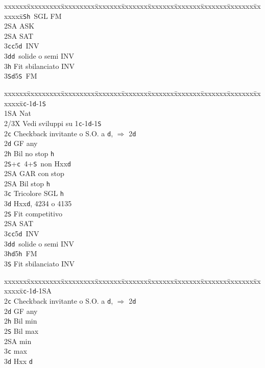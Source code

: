 \documentclass[a4paper,italian]{article}
\newcommand{\BS}{\small{\texttt{S}}}
\newcommand{\BC}{\small{\texttt{c}}}
\newcommand{\BD}{\small{\texttt{d}}}
\newcommand{\BH}{\small{\texttt{h}}}
\newenvironment{bidtable}
{\begin{tabbing}

    xxxxxx\=xxxxxxxxx\=xxxxxxxxx\=xxxxxxx\=xxxxxxx\=xxxxxxx\=xxxxxxx\=xxxxxxx\=xxxxxxx\=xxxxxxx\=\kill}
{\end{tabbing} }%
\begin{document}
\begin{multicols}{2}
\begin{bidtable}
        2\BS {}\BH\ SGL FM\+\\
        2\small{SA} \> ASK\-\\
        2\small{SA} \small{SA}T\\
        3\BC {}\BC 5\BD\ INV\\
        3\BD {}\BD\ solide o semi INV\\
        3\BH \> Fit sbilanciato INV\\
        3\BS {}\BD 5\BS\ FM\-
    \end{bidtable}
    \begin{bidtable}
        1\BC-1\BD-1\BS\+\\
        1\small{SA} \> Nat\+\\
        2/3X \> Vedi sviluppi su 1\BC -1\BD -1\BS \-\\
        2\BC \> Checkback invitante o S.O. a \BD , $\Rightarrow$ 2\BD \\
        2\BD \> GF any\+\\
        2\BH \> Bil no stop \BH \\
        2\BS {}+\BC\ 4+\BS\ non Hxx\BD \+\\
        2\small{SA} \> GAR con stop\-\\
        2\small{SA} \> Bil stop \BH \\
        3\BC \> Tricolore SGL \BH \\
        3\BD \> Hxx\BD, 4234 o 4135 \-\\
        [2pt]2\BS \> Fit competitivo\\
        2\small{SA} \small{SA}T\\
        3\BC {}\BC 5\BD\ INV\\
        3\BD {}\BD\ solide o semi INV\\
        3\BH {}\BD 5\BH\ FM\\
        3\BS \> Fit sbilanciato INV\-
    \end{bidtable}
    \begin{bidtable}
        1\BC-1\BD-1\small{SA}\+\\
        2\BC \> Checkback invitante o S.O. a \BD , $\Rightarrow$ 2\BD \\
        2\BD \> GF any\+\\
        2\BH \> Bil min\\
        2\BS \> Bil max\\
        2\small{SA}  min\\
        3\BC {} max\\
        3\BD \> Hxx \BD\-\\

\end{bidtable}
\end{multicols}
\end{document}
